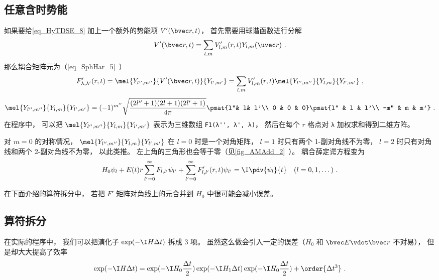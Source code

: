 \subsection{任意含时势能}
如果要给\autoref{eq_HyTDSE_8} 加上一个额外的势能项 $V'(\bvec r, t)$， 首先需要用球谐函数进行分解
\begin{equation}\label{eq_HyTDSE_6}
V'(\bvec r, t) = \sum_{l,m} V'_{l,m}(r, t) Y_{l,m}(\uvec r)~.
\end{equation}
那么耦合矩阵元为（\autoref{eq_SphHar_5}~）
\begin{equation}\label{eq_HyTDSE_5}
F'_{\lambda,\lambda'}(r, t) = \mel{Y_{l'',m''}}{V'(\bvec r, t)}{Y_{l',m'}} = \sum_{l,m} V'_{l,m}(r, t) \mel{Y_{l'',m''}}{Y_{l,m}}{Y_{l',m'}}~,
\end{equation}
\begin{equation}
\mel{Y_{l'',m''}}{Y_{l,m}}{Y_{l',m'}} = (-1)^{m''}\sqrt{\frac{(2l''+1)(2l+1)(2l'+1)}{4\pi}} \pmat{l''& l& l'\\ 0 & 0 & 0}\pmat{l'' & l & l'\\  -m'' & m & m'}~.
\end{equation}
在程序中， 可以把 $\mel{Y_{l'',m''}}{Y_{l,m}}{Y_{l',m'}}$ 表示为三维数组 \verb|F1(λ'', λ', λ)|， 然后在每个 $r$ 格点对 \verb|λ| 加权求和得到二维方阵。

对 $m = 0$ 的对称情况， $\mel{Y_{l'',m''}}{Y_{l,m}}{Y_{l',m'}}$ 在 $l = 0$ 时是一个对角矩阵， $l = 1$ 时只有两个 1-副对角线不为零， $l = 2$ 时只有对角线和两个 2-副对角线不为零， 以此类推。 左上角的三角形也会等于零（见\autoref{fig_AMAdd_2}~）。 耦合薛定谔方程变为
\begin{equation}
H_0 \psi_{l} + E(t)r\sum_{l' = 0}^{\infty} F_{l, l'} \psi_{l'} + \sum_{l'=0}^\infty F'_{l,l'}(r, t)\psi_{l'} = \I \pdv{\psi_{l}}{t} \quad (l=0,1,\dots)~.
\end{equation}

在下面介绍的算符拆分中， 若把 $F'$ 矩阵对角线上的元合并到 $H_0$ 中很可能会减小误差。

\subsection{算符拆分}
在实际的程序中， 我们可以把演化子 $\exp(-\I H \Delta t)$ 拆成 3 项。 虽然这么做会引入一定的误差（$H_0$ 和 $\bvec E\vdot\bvec r$ 不对易）， 但是却大大提高了效率
\begin{equation}\label{eq_HyTDSE_2}
\exp(-\I H \Delta t) = \exp(-\I H_0 \frac{\Delta t}{2}) \exp(-\I H_1 \Delta t)\exp(-\I H_0 \frac{\Delta t}{2}) + \order{\Delta t^3}~.
\end{equation}

